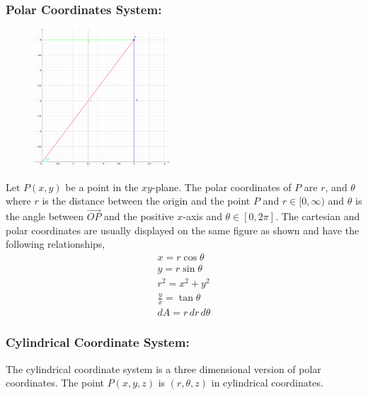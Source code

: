 \documentclass[14pt]{article}
\begin{document}
    \subsubsection{Polar Coordinates System:}
    \begin{figure}
        \vspace{-20pt}
        \includegraphics[width=0.45\textwidth]{polarCord.eps}
        \vspace{-100pt}
    \end{figure}
    Let $P(x,y )$ be a point in the $xy$-plane. The polar coordinates of $P$ are $r$, and $\theta$ where $r$ is the distance between the origin and the point $P$ and $r\in[0, \infty)$ and $\theta$ is the angle between $\vec{OP}$ and the positive $x$-axis and $\theta\in[0, 2\pi]$. The cartesian and polar coordinates are usually displayed on the same figure as shown and have the following relationships,
    \begin{align*}
        x=r\cos\theta\\
        y=r\sin\theta\\
        r^2=x^2+y^2\\
        \frac{y}{x}=\tan\theta\\
        dA=r\, dr\, d\theta
    \end{align*} 
    \subsubsection{Cylindrical Coordinate System:}
    The cylindrical coordinate system is a three dimensional version of polar coordinates. The point $P(x,y,z)$ is $(r, \theta, z)$ in cylindrical coordinates.
\end{document}
